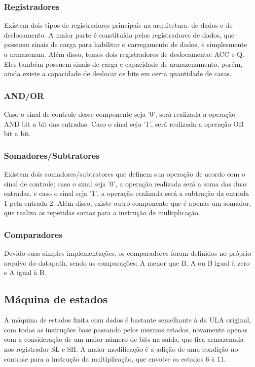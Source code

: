 \documentclass[conference]{IEEEtran}
\begin{document}
\subsubsection{Registradores}
Existem dois tipos de registradores principais na arquitetura: de dados e de deslocamento. A maior parte é constituída pelos registradores de dados, que possuem sinais de carga para habilitar o carregamento de dados, e simplesmente o armazenam. Além disso, temos dois registradores de deslocamento: ACC e Q. Eles também possuem sinais de carga e capacidade de armazenamento, porém, ainda existe a capacidade de deslocar os bits em certa quantidade de casas. \\

\subsubsection{AND/OR}
Caso o sinal de controle desse componente seja '0', será realizada a operação AND bit a bit das entradas. Caso o sinal seja '1', será realizada a operação OR bit a bit.\\

\subsubsection{Somadores/Subtratores}
Existem dois somadores/subtratores que definem sua operação de acordo com o sinal de controle; caso o sinal seja '0', a operação realizada será a soma das duas entradas, e caso o sinal seja '1', a operação realizada será a subtração da entrada 1 pela entrada 2. Além disso, existe outro componente que é apenas um somador, que realiza as repetidas somas para a instrução de multiplicação.\\

\subsubsection{Comparadores}
Devido suas simples implementações, os comparadores foram definidos no próprio arquivo do datapath, sendo as comparações: A menor que B, A ou B igual à zero e A igual à B.

\subsection{Máquina de estados}
A máquina de estados finita com dados é bastante semelhante à da ULA original, com todas as instruções base passando pelos mesmos estados, novamente apenas com a consideração de um maior número de bits na saída, que fica armazenada nos registrador SL e SH. A maior modificação é a adição de uma condição no controle para a instrução da multiplicação, que envolve os estados 6 à 11. 
\end{document}
